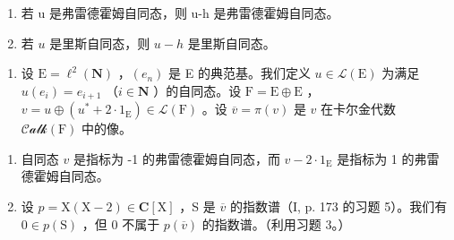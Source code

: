 \begin{enumerate}
\def\labelenumi{\alph{enumi})}
\item
  若 u 是弗雷德霍姆自同态，则 u-h 是弗雷德霍姆自同态。
\item
  若 \(u\) 是里斯自同态，则 \(u - h\) 是里斯自同态。
\end{enumerate}

\begin{enumerate}
\def\labelenumi{\arabic{enumi})}
\setcounter{enumi}{10}
\tightlist
\item
  设 \(\mathrm{E} = \ell^2 (\mathbf{N})\) ，\((e_n)\) 是 E 的典范基。我们定义 \(u\in \mathcal{L}(\mathrm{E})\) 为满足 \(u(e_i) = e_{i + 1}\) （\(i\in \mathbf{N}\) ）的自同态。设 \(\mathrm{F} = \mathrm{E}\oplus \mathrm{E}\) ，\(v = u\oplus (u^{*} + 2\cdot 1_{\mathrm{E}})\in \mathcal{L}(\mathrm{F})\) 。设 \(\overline{v} = \pi (v)\) 是 \(v\) 在卡尔金代数 \(\mathcal{Calk}(\mathrm{F})\) 中的像。
\end{enumerate}

\begin{enumerate}
\def\labelenumi{\alph{enumi})}
\item
  自同态 \(v\) 是指标为 -1 的弗雷德霍姆自同态，而 \(v - 2 \cdot 1_{\mathrm{E}}\) 是指标为 1 的弗雷德霍姆自同态。
\item
  设 \(p = \mathrm{X}(\mathrm{X} - 2) \in \mathbf{C}[\mathrm{X}]\) ，S 是 \(\overline{v}\) 的指数谱（I, p. 173 的习题 5）。我们有 \(0 \in p(\mathrm{S})\) ，但 0 不属于 \(p(\overline{v})\) 的指数谱。（利用习题 3。）
\end{enumerate}

